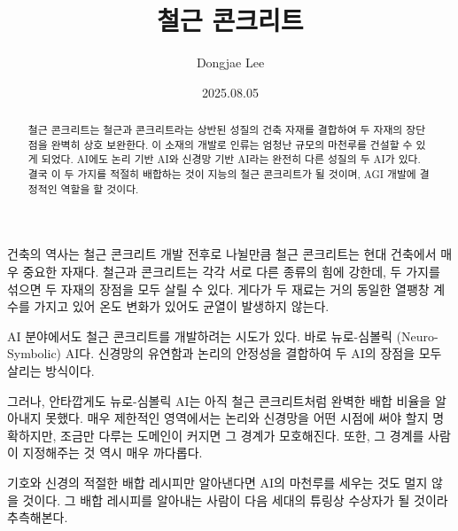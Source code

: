 \documentclass[11pt, oneside]{article}
\title{철근 콘크리트}
\author{Dongjae Lee}
\date{2025.08.05}
\begin{document}
\maketitle
\begin{abstract}
	철근 콘크리트는 철근과 콘크리트라는 상반된 성질의 건축 자재를 결합하여 두 자재의 장단점을 완벽히 상호 보완한다.
	이 소재의 개발로 인류는 엄청난 규모의 마천루를 건설할 수 있게 되었다.
	AI에도 논리 기반 AI와 신경망 기반 AI라는 완전히 다른 성질의 두 AI가 있다.
	결국 이 두 가지를 적절히 배합하는 것이 지능의 철근 콘크리트가 될 것이며, AGI 개발에 결정적인 역할을 할 것이다.
\end{abstract}

건축의 역사는 철근 콘크리트 개발 전후로 나뉠만큼 철근 콘크리트는 현대 건축에서 매우 중요한 자재다.
철근과 콘크리트는 각각 서로 다른 종류의 힘에 강한데, 두 가지를 섞으면 두 자재의 장점을 모두 살릴 수 있다.
게다가 두 재료는 거의 동일한 열팽창 계수를 가지고 있어 온도 변화가 있어도 균열이 발생하지 않는다.

AI 분야에서도 철근 콘크리트를 개발하려는 시도가 있다. 바로 뉴로-심볼릭 (Neuro-Symbolic) AI다.
신경망의 유연함과 논리의 안정성을 결합하여 두 AI의 장점을 모두 살리는 방식이다.

그러나, 안타깝게도 뉴로-심볼릭 AI는 아직 철근 콘크리트처럼 완벽한 배합 비율을 알아내지 못했다.
매우 제한적인 영역에서는 논리와 신경망을 어떤 시점에 써야 할지 명확하지만, 조금만 다루는 도메인이 커지면 그 경계가 모호해진다.
또한, 그 경계를 사람이 지정해주는 것 역시 매우 까다롭다.

기호와 신경의 적절한 배합 레시피만 알아낸다면 AI의 마천루를 세우는 것도 멀지 않을 것이다.
그 배합 레시피를 알아내는 사람이 다음 세대의 튜링상 수상자가 될 것이라 추측해본다.
\end{document}
